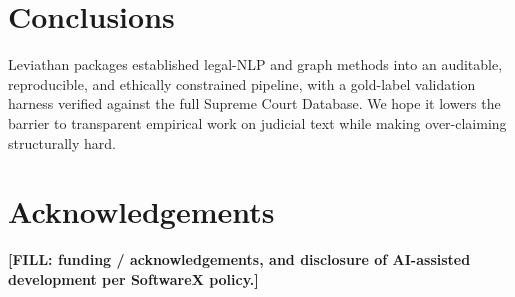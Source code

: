 \documentclass[preprint,12pt]{elsarticle}
\newcommand{\FILL}[1]{{\color{red}\textbf{[FILL: #1]}}}
\begin{document}
\section{Conclusions}
Leviathan packages established legal-NLP and graph methods into an auditable, reproducible, and
ethically constrained pipeline, with a gold-label validation harness verified against the full
Supreme Court Database. We hope it lowers the barrier to transparent empirical work on judicial text
while making over-claiming structurally hard.

\section*{Acknowledgements}
\FILL{funding / acknowledgements, and disclosure of AI-assisted development per SoftwareX policy.}



\end{document}
